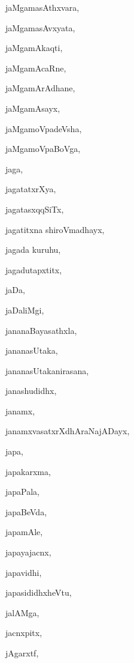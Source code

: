 \begin{multicols}{2}
{jaMgamasAthxvara}, \pageref{jaMgamasAthxvara}

{jaMgamasAvxyata}, \pageref{jaMgamasAvxyata}

{jaMgamAkaqti}, \pageref{jaMgamAkaqti}

{jaMgamAcaRne}, \pageref{jaMgamAcaRne}

{jaMgamArAdhane}, \pageref{jaMgamArAdhane}

{jaMgamAsayx}, \pageref{jaMgamAsayx}

{jaMgamoVpadeVsha}, \pageref{jaMgamoVpadeVsha}

{jaMgamoVpaBoVga}, \pageref{jaMgamoVpaBoVga}

{jaga}, \pageref{jaga}

{jagatatxrXya}, \pageref{jagatatxrXya}

{jagatasxqqSiTx}, \pageref{jagatasxqqSiTx}

{jagatitxna shiroVmadhayx}, \pageref{jagatitxna shiroVmadhayx}

{jagada kuruhu}, \pageref{jagada kuruhu}

{jagadutapxtitx}, \pageref{jagadutapxtitx}

{jaDa}, \pageref{jaDa}

{jaDaliMgi}, \pageref{jaDaliMgi}

{jananaBayasathxla}, \pageref{jananaBayasathxla}

{jananasUtaka}, \pageref{jananasUtaka}

{jananasUtakanirasana}, \pageref{jananasUtakanirasana}

{janashudidhx}, \pageref{janashudidhx}

{janamx}, \pageref{janamx}

{janamxvasatxrXdhAraNajADayx}, \pageref{janamxvasatxrXdhAraNajADayx}

{japa}, \pageref{japa}

{japakarxma}, \pageref{japakarxma}

{japaPala}, \pageref{japaPala}

{japaBeVda}, \pageref{japaBeVda}

{japamAle}, \pageref{japamAle}

{japayajacnx}, \pageref{japayajacnx}

{japavidhi}, \pageref{japavidhi}

{japasididhxheVtu}, \pageref{japasididhxheVtu}

{jalAMga}, \pageref{jalAMga}

{jacnxpitx}, \pageref{jacnxpitx}

{jAgarxtf}, \pageref{jAgarxtf}


\end{multicols}
